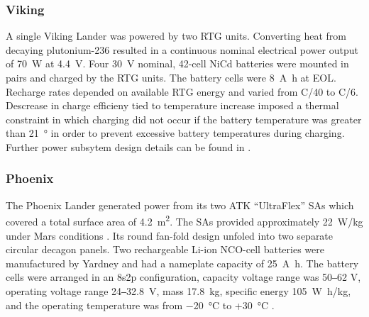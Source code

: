 \subsubsection{Viking}

A single Viking Lander was powered by two \ac{RTG} units. Converting heat from decaying plutonium-236 resulted in a continuous nominal electrical power output of \SI{70}{\watt} at \SI{4.4}{\volt}. Four \SI{30}{\volt} nominal, 42-cell \ac{NiCd} batteries were mounted in pairs and charged by the \ac{RTG} units. The battery cells were \SI{8}{\ampere\hour} at \ac{EOL}. Recharge rates depended on available \ac{RTG} energy and varied from C/40 to C/6. Descrease in charge efficieny tied to temperature increase imposed a thermal constraint in which charging did not occur if the battery temperature was greater than \SI{21}{\degree} in order to prevent excessive battery temperatures during charging. Further power subsytem design details can be found in .

\subsubsection{Phoenix}

The Phoenix Lander generated power from its two ATK ``UltraFlex'' \acp{SA} which covered a total surface area of \SI{4.2}{\meter\squared}. The \acp{SA} provided approximately \SI{22}{\watt/\kilo\gram} under Mars conditions  . Its round fan-fold design unfoled into two separate circular decagon panels. Two rechargeable \ac{Li-ion} \ac{NCO}-cell batteries were manufactured by Yardney and had a nameplate capacity of \SI{25}{\ampere\hour}. The battery cells were arranged in an 8s2p configuration, capacity voltage range was 50‒62 \si{\volt}, operating voltage range 24‒\SI{32.8}{\volt}, mass \SI{17.8}{\kilo\gram}, specific energy \SI{105}{\watt\hour/\kilo\gram}, and the operating temperature was from \SI{-20}{\celsius} to +\SI{30}{\celsius} .

